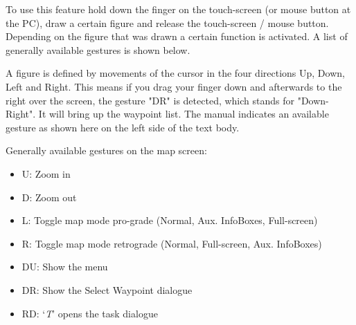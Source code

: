 To use this feature hold down the finger on the 
touch-screen (or mouse button at the PC), draw a certain figure and release 
the touch-screen / mouse button. Depending on the figure that was drawn 
a certain function is activated. A list of generally available gestures is 
shown below. 

A figure is defined by movements of the 
cursor in the four directions Up, Down, Left and Right. This means if 
you drag your finger down and afterwards to the right over the screen, 
 the gesture "DR" is detected, which stands for "Down-Right". 
It will bring up the waypoint list. The manual indicates an available 
gesture as shown here on the left side of the text body.

Generally available gestures on the map screen:
\begin{itemize}
\item U: Zoom in
\item D: Zoom out
\item L: Toggle map mode pro-grade (Normal, Aux. InfoBoxes, Full-screen)
\item R: Toggle map mode retrograde (Normal, Full-screen, Aux. InfoBoxes)
\item DU: Show the menu
\item DR: Show the Select Waypoint dialogue
\item RD: `{\it T}' opens the task dialogue
\end{itemize}

